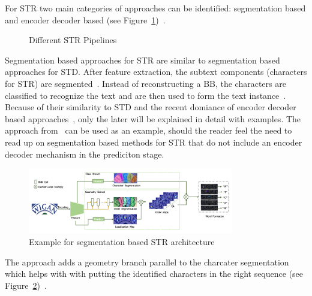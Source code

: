 For \ac{STR} two main categories of approaches can be identified: segmentation based and
encoder decoder based (see Figure~\ref{fig:str-pipelines})~\citep{chen_text_2021}.
\begin{figure}[h]
    \centering
    
    \caption{Different STR Pipelines\label{fig:str-pipelines}}
\end{figure}
Segmentation based approaches for \ac{STR} are similar to segmentation based approaches for \ac{STD}.
After feature extraction, the subtext components (characters for \ac{STR}) are
segmented~\citep{chen_text_2021}.
Instead of reconstructing a \ac{BB}, the characters are classified to recognize the
text and are then used to form the text instance~\citep{chen_text_2021}.
Because of their similarity to \ac{STD} and the recent domiance of encoder decoder based
approaches~\citep{chen_text_2021,long_scene_2021}, only the later will be explained in detail with
examples.
The approach from~\cite{wan_textscanner_2020} can be used as an example, should the reader feel the
need to read up on segmentation based methods for \ac{STR} that do not include an encoder decoder
mechanism in the prediciton stage.
\begin{figure}[h]
    \centering
    \includegraphics[width=0.8\textwidth]{img/STR-seg-based-wan-textscaner-2020.png}
    \caption[Segmentation based STR architecture]{%
        Example for segmentation based STR
        architecture~\citep{wan_textscanner_2020}\label{fig:STR-segbased-architecture}
    }
\end{figure}
The approach adds a geometry branch parallel to the charcater segmentation which helps with with
putting the identified characters in the right sequence (see
Figure~\ref{fig:STR-segbased-architecture})~\citep{wan_textscanner_2020}.

